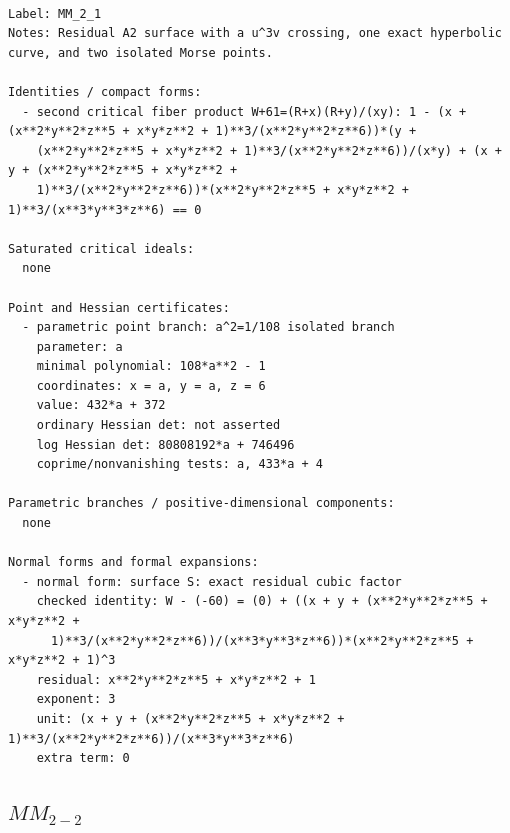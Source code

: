 \documentclass[10pt,a4paper]{article}
\begin{document}
\begin{lstlisting}

Label: MM_2_1
Notes: Residual A2 surface with a u^3v crossing, one exact hyperbolic curve, and two isolated Morse points.

Identities / compact forms:
  - second critical fiber product W+61=(R+x)(R+y)/(xy): 1 - (x + (x**2*y**2*z**5 + x*y*z**2 + 1)**3/(x**2*y**2*z**6))*(y +
    (x**2*y**2*z**5 + x*y*z**2 + 1)**3/(x**2*y**2*z**6))/(x*y) + (x + y + (x**2*y**2*z**5 + x*y*z**2 +
    1)**3/(x**2*y**2*z**6))*(x**2*y**2*z**5 + x*y*z**2 + 1)**3/(x**3*y**3*z**6) == 0

Saturated critical ideals:
  none

Point and Hessian certificates:
  - parametric point branch: a^2=1/108 isolated branch
    parameter: a
    minimal polynomial: 108*a**2 - 1
    coordinates: x = a, y = a, z = 6
    value: 432*a + 372
    ordinary Hessian det: not asserted
    log Hessian det: 80808192*a + 746496
    coprime/nonvanishing tests: a, 433*a + 4

Parametric branches / positive-dimensional components:
  none

Normal forms and formal expansions:
  - normal form: surface S: exact residual cubic factor
    checked identity: W - (-60) = (0) + ((x + y + (x**2*y**2*z**5 + x*y*z**2 +
      1)**3/(x**2*y**2*z**6))/(x**3*y**3*z**6))*(x**2*y**2*z**5 + x*y*z**2 + 1)^3
    residual: x**2*y**2*z**5 + x*y*z**2 + 1
    exponent: 3
    unit: (x + y + (x**2*y**2*z**5 + x*y*z**2 + 1)**3/(x**2*y**2*z**6))/(x**3*y**3*z**6)
    extra term: 0

\end{lstlisting}

\subsection*{$ MM_{2-2} $}
\end{document}
